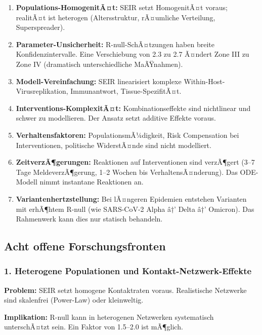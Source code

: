 ﻿\documentclass[a4paper,12pt,twoside]{article}
\theoremstyle{definition}
\begin{document}
\begin{enumerate}
\item \textbf{Populations-HomogenitÃ¤t:} SEIR setzt HomogenitÃ¤t voraus; realitÃ¤t ist heterogen (Altersstruktur, rÃ¤umliche Verteilung, Superspreader).

\item \textbf{Parameter-Unsicherheit:} R-null-SchÃ¤tzungen haben breite Konfidenzintervalle. Eine Verschiebung von 2.3 zu 2.7 Ã¤ndert Zone III zu Zone IV (dramatisch unterschiedliche MaÃŸnahmen).

\item \textbf{Modell-Vereinfachung:} SEIR linearisiert komplexe Within-Host-Virusreplikation, Immunantwort, Tissue-SpezifitÃ¤t.

\item \textbf{Interventions-KomplexitÃ¤t:} Kombinationseffekte sind nichtlinear und schwer zu modellieren. Der Ansatz setzt additive Effekte voraus.

\item \textbf{Verhaltensfaktoren:} PopulationsmÃ¼digkeit, Risk Compensation bei Interventionen, politische WiderstÃ¤nde sind nicht modelliert.

\item \textbf{ZeitverzÃ¶gerungen:} Reaktionen auf Interventionen sind verzÃ¶gert (3--7 Tage MeldeverzÃ¶gerung, 1--2 Wochen bis VerhaltensÃ¤nderung). Das ODE-Modell nimmt instantane Reaktionen an.

\item \textbf{Variantenhertzstellung:} Bei lÃ¤ngeren Epidemien entstehen Varianten mit erhÃ¶htem R-null (wie SARS-CoV-2 Alpha â†’ Delta â†’ Omicron). Das Rahmenwerk kann dies nur statisch behandeln.

\end{enumerate}

\subsection{Acht offene Forschungsfronten}

\subsubsection{1. Heterogene Populationen und Kontakt-Netzwerk-Effekte}

\textbf{Problem:} SEIR setzt homogene Kontaktraten voraus. Realistische Netzwerke sind skalenfrei (Power-Law) oder kleinweltig.

\textbf{Implikation:} R-null kann in heterogenen Netzwerken systematisch unterschÃ¤tzt sein. Ein Faktor von 1.5--2.0 ist mÃ¶glich.
\end{document}
